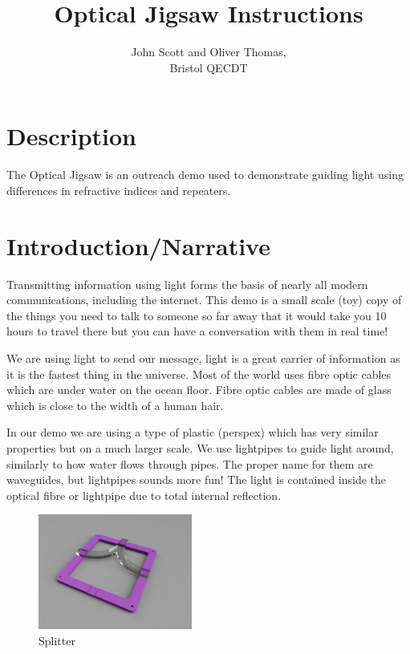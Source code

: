 \documentclass[12pt]{article}
\author{John Scott and Oliver Thomas,\\Bristol QECDT}
\title{Optical Jigsaw Instructions}
\begin{document}
\maketitle

\section{Description}

The Optical Jigsaw is an outreach demo used to demonstrate guiding light using differences in refractive indices and repeaters.

\section{Introduction/Narrative}

Transmitting information using light forms the basis of nearly all modern communications, including the internet. This demo is a small scale (toy) copy of the things you need to talk to someone so far away that it would take you 10 hours to travel there but you can have a conversation with them in real time! 

We are using light to send our message, light is a great carrier of information as it is the fastest thing in the universe. Most of the world uses fibre optic cables which are under water on the ocean floor. Fibre optic cables are made of glass which is close to the width of a human hair.

In our demo we are using a type of plastic (perspex) which has very similar properties but on a much larger scale. We use lightpipes to guide light around, similarly to how water flows through pipes. The proper name for them are waveguides, but lightpipes sounds more fun! The light is contained inside the optical fibre or lightpipe due to total internal reflection.

\begin{figure}[h]
\centering
\includegraphics[width=0.45\textwidth]{figures/jigsaw_y-junction.jpg}
\caption{Splitter}
\end{figure}
\end{document}

